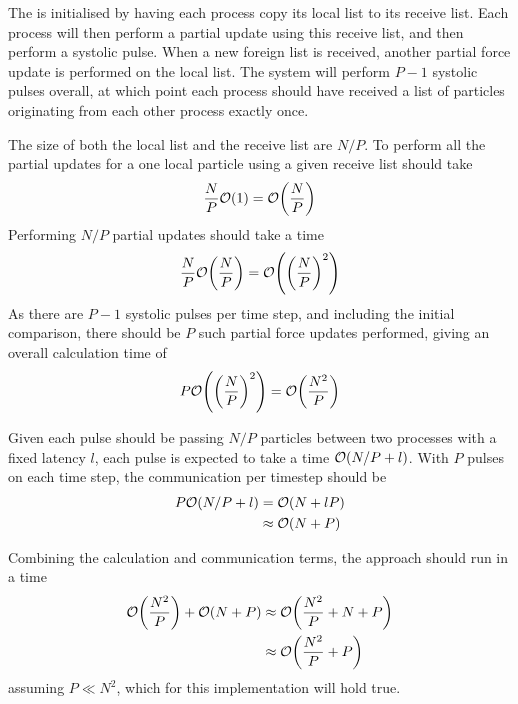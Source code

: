 The \systolicloop{} is initialised by having each process
copy its local list to its receive list.
%
Each process will then perform a partial update using this receive
list, and then perform a systolic pulse.
%
When a new foreign list is received, another partial force update
is performed on the local list.
%
The system will perform $P-1$ systolic pulses overall, at which point
each process should have received a list of particles originating
from each other process exactly once.

The size of both the local list and the receive list are $N/P$.
%
To perform all the partial updates for a one local particle
using a given receive list should take
\begin{equation}
    \frac{N}{P}\mathcal{O}{\left({ 1 }\right)} = \mathcal{O}{\left({ \frac{N}{P} }\right)}
\end  {equation}
%
Performing $N/P$ partial updates should take a time
\begin{equation}
    \frac{N}{P}\mathcal{O}{\left({ \frac{N}{P} }\right)} = \mathcal{O}{\left({ \left( \frac{N}{P} \right)^2 }\right)}
\end  {equation}
%
As there are $P-1$ systolic pulses per time step, and including
the initial comparison, there should be $P$ such partial force updates
performed, giving an overall calculation time of
\begin{equation}
    P\mathcal{O}{\left({  \left(\frac{N}{P}\right)^2  }\right)} = \mathcal{O}{\left({ \frac{N^2}{P} }\right)}
\end  {equation}

Given each pulse should be passing $N/P$ particles between two processes
with a fixed latency $l$, each pulse is expected to take a time
$\mathcal{O}{\left({ N/P + l }\right)}$.
%
With $P$ pulses on each time step, the communication per timestep should be
\begin{align}
    P\mathcal{O}{\left({ N/P + l }\right)} &= \mathcal{O}{\left({ N + lP }\right)} \\
                    &\approx{} \mathcal{O}{\left({ N + P }\right)}
\end  {align}

Combining the calculation and communication terms, the \systolicloop{} approach
should run in a time
\begin{align}
    \mathcal{O}{\left({ \frac{N^2}{P} }\right)} + \mathcal{O}{\left({ N + P }\right)}
        &\approx{} \mathcal{O}{\left({ \frac{N^2}{P} + N + P }\right)} \\
        &\approx{} \mathcal{O}{\left({ \frac{N^2}{P} + P }\right)}
\end  {align}
assuming $P \ll{} N^2$, which for this implementation will hold true.

\begin{figure}[!h]
    
    \caption{}
    \label{fig:v0_systolic_pair_operation_512_logtime}
\end  {figure}

